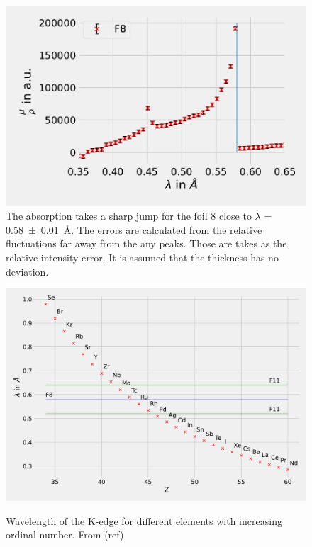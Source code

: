 \begin{figure}[h]
    \centering
    \includegraphics[width = 12cm]{Programming/Absorption/F8Kedge.pdf}
    \caption{The absorption takes a sharp jump for the foil 8 close to $\lambda$ = \SI{0.58\pm0.01}{\angstrom}. The errors are calculated from the  relative fluctuations far away from the any peaks. Those are takes as the relative intensity error. It is assumed that the thickness has no deviation.}
    \label{fig:F8edge}
\end{figure}


\begin{figure}[ht]
    \centering
    \includegraphics[angle = 90, width = 0.95\linewidth]{Programming/Absorption/Elements.pdf}
    \label{fig:Elements}
    \caption{Wavelength of the K-edge for different elements with increasing ordinal number. From (ref)}
\end{figure}


